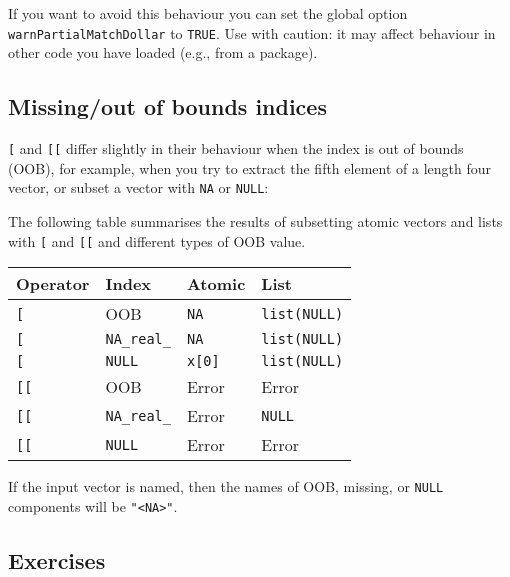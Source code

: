 If you want to avoid this behaviour you can set the global option
\texttt{warnPartialMatchDollar} to \texttt{TRUE}. Use with caution: it
may affect behaviour in other code you have loaded (e.g., from a
package).

\subsection{Missing/out of bounds indices}

\texttt{{[}} and \texttt{{[}{[}} differ slightly in their behaviour when
the index is out of bounds (OOB), for example, when you try to extract
the fifth element of a length four vector, or subset a vector with
\texttt{NA} or \texttt{NULL}: 

\begin{Shaded}
\begin{Highlighting}[]
\StringTok{ }\NormalTok{:}
\NormalTok{(x[}\NormalTok{])}
\NormalTok{(x[}\NormalTok{])}
\NormalTok{(x[}\NormalTok{])}
\end{Highlighting}
\end{Shaded}

The following table summarises the results of subsetting atomic vectors
and lists with \texttt{{[}} and \texttt{{[}{[}} and different types of
OOB value.

\begin{longtable}[c]{@{}llll@{}}
\toprule
Operator & Index & Atomic & List\tabularnewline
\midrule
\endhead
\texttt{{[}} & OOB & \texttt{NA} & \texttt{list(NULL)}\tabularnewline
\texttt{{[}} & \texttt{NA\_real\_} & \texttt{NA} &
\texttt{list(NULL)}\tabularnewline
\texttt{{[}} & \texttt{NULL} & \texttt{x{[}0{]}} &
\texttt{list(NULL)}\tabularnewline
\texttt{{[}{[}} & OOB & Error & Error\tabularnewline
\texttt{{[}{[}} & \texttt{NA\_real\_} & Error &
\texttt{NULL}\tabularnewline
\texttt{{[}{[}} & \texttt{NULL} & Error & Error\tabularnewline
\bottomrule
\end{longtable}

If the input vector is named, then the names of OOB, missing, or
\texttt{NULL} components will be \texttt{"\textless{}NA\textgreater{}"}.

\subsection{Exercises}

